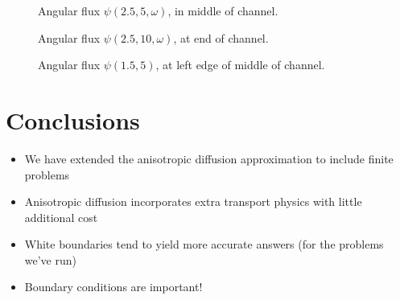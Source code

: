 \documentclass{beamer}
\begin{document}
\begin{frame}
\begin{figure}[tb]
  \centering
  
  \caption{Angular flux $\psi(2.5,5,\omega)$, in middle of channel.}
  \label{fig:psi5}
\end{figure}
\end{frame}

\begin{frame}
\begin{figure}[tb]
  \centering
  
  \caption{Angular flux $\psi(2.5,10,\omega)$, at end of channel.}
  \label{fig:psi10}
\end{figure}
\end{frame}

\begin{frame}
\begin{figure}[tb]
  \centering
  
  \caption{Angular flux $\psi(1.5,5)$, at left edge of middle of channel.}
  \label{fig:psiEdge}
\end{figure}
\end{frame}

\section{Conclusions}
\begin{frame}
\begin{itemize}
  \item We have extended the anisotropic diffusion approximation to include
    finite problems
  \item Anisotropic diffusion incorporates extra transport physics with little
    additional cost
  \item White boundaries tend to yield more accurate answers (for the problems
    we've run)
  \item Boundary conditions are important!
\end{itemize}
\end{frame}
\end{document}
